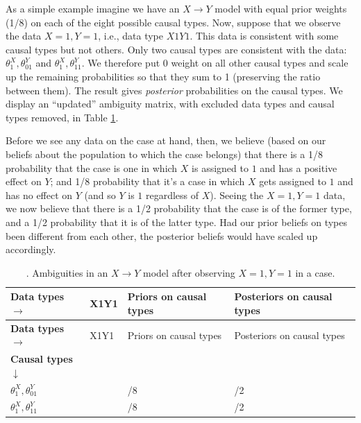\documentclass[
  12pt,
]{book}
\begin{document}
As a simple example imagine we have an \(X\rightarrow Y\) model with equal prior weights (1/8) on each of the eight possible causal types. Now, suppose that we observe the data \(X=1, Y=1\), i.e., data type \(X1Y1\). This data is consistent with some causal types but not others. Only two causal types are consistent with the data: \(\theta^X_1, \theta^Y_{01}\) and \(\theta^X_1, \theta^Y_{11}\). We therefore put 0 weight on all other causal types and scale up the remaining probabilities so that they sum to 1 (preserving the ratio between them). The result gives \emph{posterior} probabilities on the causal types. We display an ``updated'' ambiguity matrix, with excluded data types and causal types removed, in Table \ref{tab:ambigupdate}.

Before we see any data on the case at hand, then, we believe (based on our beliefs about the population to which the case belongs) that there is a 1/8 probability that the case is one in which \(X\) is assigned to \(1\) and has a positive effect on \(Y\); and 1/8 probability that it's a case in which \(X\) gets assigned to \(1\) and has no effect on \(Y\) (and so \(Y\) is \(1\) regardless of \(X\)). Seeing the \(X=1, Y=1\) data, we now believe that there is a 1/2 probability that the case is of the former type, and a 1/2 probability that it is of the latter type. Had our prior beliefs on types been different from each other, the posterior beliefs would have scaled up accordingly.

\begin{longtable}[]{@{}
  >{\centering\arraybackslash}p{}
  >{\centering\arraybackslash}p{}
  >{\centering\arraybackslash}p{}
  >{\centering\arraybackslash}p{}@{}}
\caption{\label{tab:ambigupdate}. Ambiguities in an \(X \rightarrow Y\) model after observing \(X=1, Y=1\) in a case.}\tabularnewline
\toprule
\textbf{Data types} \(\rightarrow\) & X1Y1 & Priors on causal types & Posteriors on causal types \\
\midrule
\endfirsthead
\toprule
\textbf{Data types} \(\rightarrow\) & X1Y1 & Priors on causal types & Posteriors on causal types \\
\midrule
\endhead
\textbf{Causal types} \(\downarrow\) & & & \\
\(\theta^X_1,\theta^Y_{01}\) & 1 & 1/8 & 1/2 \\
\(\theta^X_1,\theta^Y_{11}\) & 1 & 1/8 & 1/2 \\
\bottomrule
\end{longtable}
\end{document}
